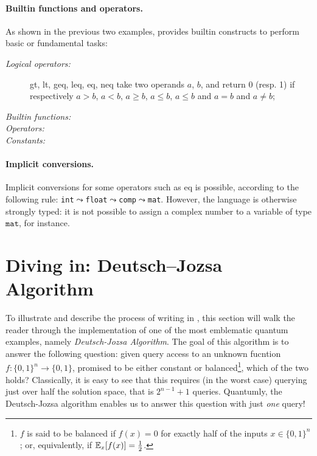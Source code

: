 \paragraph{Builtin functions and operators.} As shown in the previous two examples, \QL provides builtin constructs to perform basic or fundamental tasks:
\begin{description}
  \item[\rm\em Logical operators:] \textsf{gt}, \textsf{lt}, \textsf{geq}, \textsf{leq}, \textsf{eq}, \textsf{neq} take two operands $a$, $b$, and return 0 (resp. 1) if respectively $a > b$, $a < b$, $a \geq b$, $a \leq b$, $a \leq b$ and $a = b$ and $a \neq b$;
  \item[\rm\em Builtin functions:] 
  \item[\rm\em Operators:] 
  \item[\rm\em Constants:] 
\end{description}

\paragraph{Implicit conversions.} 
Implicit conversions for some operators such as \textsf{eq} is possible, according to the following rule: \texttt{int}$\leadsto$\texttt{float}$\leadsto$\texttt{comp}$\leadsto$\texttt{mat}. However, the language is otherwise strongly typed: it is not possible to assign a complex number to a variable of type $\texttt{mat}$, for instance.


\section{Diving in: Deutsch--Jozsa Algorithm}

To illustrate and describe the process of writing in \QL, this section will walk the reader through the implementation of one of the most emblematic quantum examples, namely \emph{Deutsch-Jozsa Algorithm}. The goal of this algorithm is to answer the following question: given query access to an unknown fucntion $f\colon\{0,1\}^n \to \{0,1\}$, promised to be either constant or balanced\footnote{$f$ is said to be balanced if $f(x)=0$ for exactly half of the inputs $x\in\{0,1\}^n$; or, equivalently, if $\mathbb{E}_{x}[f(x)] = \frac{1}{2}$.}, which of the two holds?  Classically, it is easy to see that this requires (in the worst case) querying just over half the solution space, that is $2^{n-1} + 1$ queries.  Quantumly, the Deutsch-Jozsa algorithm enables us to answer this question with just \emph{one} query!\medskip


